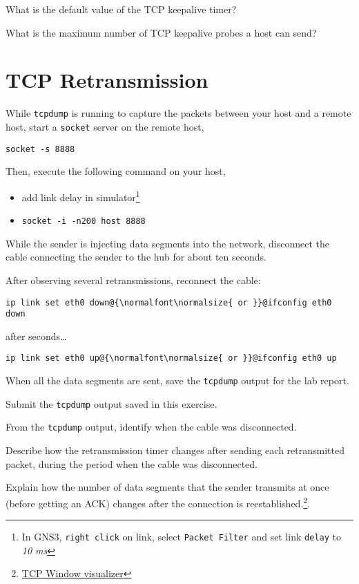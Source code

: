 \documentclass{../UTNetLab}
\begin{document}
    \begin{report}
    \item What is the default value of the TCP keepalive timer?
    
    \item What is the maximum number of TCP keepalive probes a host can send?
    \end{report}

\section{TCP Retransmission}
    While \lstinline{tcpdump} is running to capture the packets between your host and a remote host, start a \lstinline{socket} server on the remote host,
    \begin{lstlisting}
socket -s 8888
    \end{lstlisting}
    Then, execute the following command on your host,
    \begin{itemize}
        \item add link delay in simulator\footnote{In GNS3, \lstinline{right click} on link, select \lstinline{Packet Filter} and set link \lstinline{delay} to \textit{10 ms}}
        \item \lstinline[emph={host}]{socket -i -n200 host 8888}
    \end{itemize}
    While the sender is injecting data segments into the network, disconnect the cable connecting the sender to the hub for about ten seconds.

    After observing several retransmissions, reconnect the cable:
    \begin{lstlisting}
ip link set eth0 down@{\normalfont\normalsize{ or }}@ifconfig eth0 down
    \end{lstlisting}
after seconds\ldots
    \begin{lstlisting}
ip link set eth0 up@{\normalfont\normalsize{ or }}@ifconfig eth0 up
    \end{lstlisting}
    When all the data segments are sent, save the \lstinline{tcpdump} output for the lab report.
    
    \begin{report}
    \item Submit the \lstinline{tcpdump} output saved in this exercise.
    
    \item From the \lstinline{tcpdump} output, identify when the cable was disconnected.
    
    \item Describe how the retransmission timer changes after sending each retransmitted packet, during the period when the cable was disconnected.
    
    \item Explain how the number of data segments that the sender transmits at once (before getting an ACK) changes after the connection is reestablished.\footnote{\href{http://www.ccs-labs.org/teaching/rn/animations/gbn_sr/}{TCP Window visualizer}}.
    \end{report}
    
\end{document}
